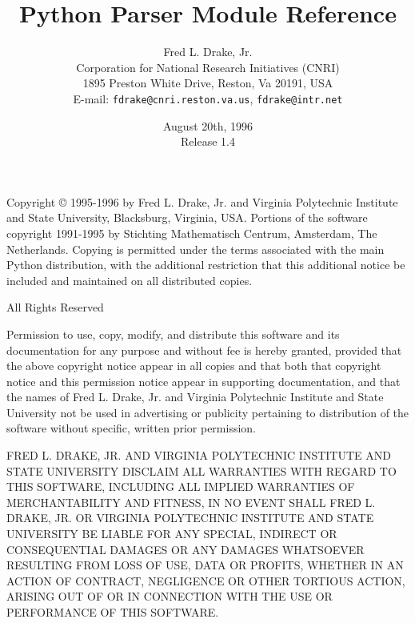 

\title{Python Parser Module Reference}
\author{
	Fred L. Drake, Jr. \\
	Corporation for National Research Initiatives (CNRI) \\
	1895 Preston White Drive, Reston, Va 20191, USA \\
	E-mail: {\tt fdrake@cnri.reston.va.us}, {\tt fdrake@intr.net}
}

\date{August 20th, 1996 \\ Release 1.4}




\maketitle

Copyright \copyright{} 1995-1996 by Fred L. Drake, Jr. and Virginia
Polytechnic Institute and State University, Blacksburg, Virginia, USA.
Portions of the software copyright 1991-1995 by Stichting Mathematisch
Centrum, Amsterdam, The Netherlands.  Copying is permitted under the
terms associated with the main Python distribution, with the
additional restriction that this additional notice be included and
maintained on all distributed copies.

\begin{center}
All Rights Reserved
\end{center}

Permission to use, copy, modify, and distribute this software and its
documentation for any purpose and without fee is hereby granted,
provided that the above copyright notice appear in all copies and that
both that copyright notice and this permission notice appear in
supporting documentation, and that the names of Fred L. Drake, Jr. and
Virginia Polytechnic Institute and State University not be used in
advertising or publicity pertaining to distribution of the software
without specific, written prior permission.

FRED L. DRAKE, JR. AND VIRGINIA POLYTECHNIC INSTITUTE AND STATE
UNIVERSITY DISCLAIM ALL WARRANTIES WITH REGARD TO THIS SOFTWARE,
INCLUDING ALL IMPLIED WARRANTIES OF MERCHANTABILITY AND FITNESS, IN NO
EVENT SHALL FRED L. DRAKE, JR. OR VIRGINIA POLYTECHNIC INSTITUTE AND
STATE UNIVERSITY BE LIABLE FOR ANY SPECIAL, INDIRECT OR CONSEQUENTIAL
DAMAGES OR ANY DAMAGES WHATSOEVER RESULTING FROM LOSS OF USE, DATA OR
PROFITS, WHETHER IN AN ACTION OF CONTRACT, NEGLIGENCE OR OTHER
TORTIOUS ACTION, ARISING OUT OF OR IN CONNECTION WITH THE USE OR
PERFORMANCE OF THIS SOFTWARE.

